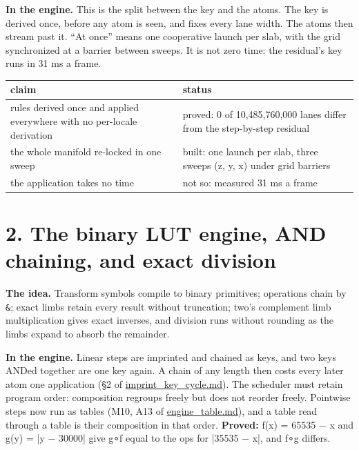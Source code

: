 \textbf{In the engine.} This is the split between the key and the atoms. The key is derived once, before any atom is seen, and fixes every lane width. The atoms then stream past it. “At once” means one cooperative launch per slab, with the grid synchronized at a barrier between sweeps. It is not zero time: the residual's key runs in 31 ms a frame.

{\small
\setlength{\tabcolsep}{6pt}
\begin{longtable}{>{\RaggedRight\arraybackslash}p{}>{\RaggedRight\arraybackslash}p{}}
\toprule
claim & status \\
\midrule
\endhead
rules derived once and applied everywhere with no per-locale derivation & proved: 0 of 10,485,760,000 lanes differ from the step-by-step residual \\
the whole manifold re-locked in one sweep & built: one launch per slab, three sweeps (z, y, x) under grid barriers \\
the application takes no time & not so: measured 31 ms a frame \\
\bottomrule
\end{longtable}
}

\section{\texorpdfstring{2. The binary LUT engine, AND chaining, and exact division}{2. The binary LUT engine, AND chaining, and exact division}}

\textbf{The idea.} Transform symbols compile to binary primitives; operations chain by \texttt{\&}; exact limbs retain every result without truncation; two's complement limb multiplication gives exact inverses, and division runs without rounding as the limbs expand to absorb the remainder.

\textbf{In the engine.} Linear steps are imprinted and chained as keys, and two keys ANDed together are one key again. A chain of any length then costs every later atom one application (§2 of \hyperref[chap:imprint-key-cycle]{imprint\_\allowbreak{}key\_\allowbreak{}cycle.md}). The scheduler must retain program order: composition regroups freely but does not reorder freely. Pointwise steps now run as tables (M10, A13 of \hyperref[chap:engine-table]{engine\_\allowbreak{}table.md}), and a table read through a table is their composition in that order. \textbf{Proved:} f(x) = 65535 − x and g(y) = |y − 30000| give g∘f equal to the ops for |35535 − x|, and f∘g differs.

